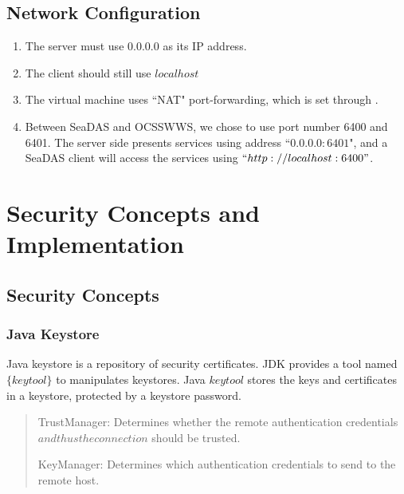 \documentclass[11pt, oneside]{article}   	%
\begin{document}
\subsection{Network Configuration}
\begin{enumerate}
\item The server must use $0.0.0.0$ as its IP address.
\item The client should still use $localhost$
\item The virtual machine uses ``NAT" port-forwarding, which is set through {\color{blue}{\bf Devices $\rightarrow$ Network $\rightarrow$ Network Settings ... }}.
\item  Between SeaDAS and OCSSWWS, we chose to use port number 6400 and 6401. The server side presents services using address ``$0.0.0.0:6401$", and a SeaDAS client will access the services using $``http://localhost:6400"$.
\end{enumerate}

\pagebreak

\section{\color{DarkOrange}Security Concepts and Implementation}
\subsection{\color{DarkBlue} Security Concepts}
\subsubsection{\color{DeepPink4}Java Keystore}


Java keystore is a repository of security certificates.
JDK provides a tool named $\{keytool\}$ to manipulates keystores. Java $keytool$ stores the keys and certificates in a keystore, protected by a keystore password.

\begin{quote}
TrustManager: Determines whether the remote authentication credentials \(and thus the connection\) should be trusted.

KeyManager: Determines which authentication credentials to send to the remote host.
\end{quote}
\end{document}
